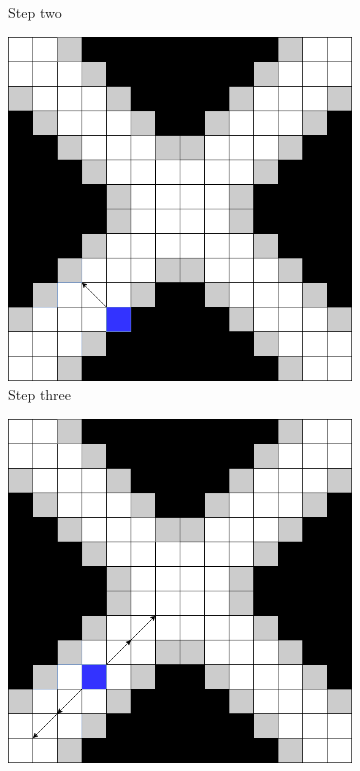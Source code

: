 \documentclass[../Head/Main.tex]{subfiles}
\begin{document}
\begin{figure}[H]
\begin{subfigure}{.24\textwidth}
        \caption{Step two}
        \label{fig:fence_search_step2}
    \end{subfigure}
    \hfill
    \begin{subfigure}{.24\textwidth}
        \centering
        \includegraphics[width=\textwidth]{../Figures/screening_algorithm/fence_search_step3.png}
        \caption{Step three}
        \label{fig:fence_search_step3}
    \end{subfigure}
    \hfill
    \begin{subfigure}{.24\textwidth}
        \centering
        \includegraphics[width=\textwidth]{../Figures/screening_algorithm/fence_search_step4.png}

\end{subfigure}
\end{figure}
\end{document}
